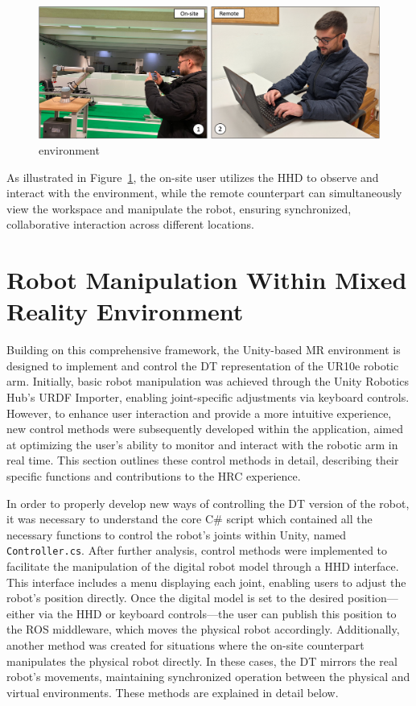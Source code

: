 \begin{figure}[h]
    \centering
    \includegraphics[width=\linewidth]{figs/mr-collab.png}
    \caption{environment}
    \label{fig:project_framework}
\end{figure}

As illustrated in Figure~\ref{fig:project_framework}, the on-site user utilizes the \ac{HHD} to observe and interact with the environment, while the remote counterpart can simultaneously view the workspace and manipulate the robot, ensuring synchronized, collaborative interaction across different locations.


\section{Robot Manipulation Within Mixed Reality Environment}

Building on this comprehensive framework, the Unity-based \ac{MR} environment is designed to implement and control the \ac{DT} representation of the UR10e robotic arm. Initially, basic robot manipulation was achieved through the Unity Robotics Hub's \ac{URDF} Importer, enabling joint-specific adjustments via keyboard controls. However, to enhance user interaction and provide a more intuitive experience, new control methods were subsequently developed within the application, aimed at optimizing the user’s ability to monitor and interact with the robotic arm in real time. This section outlines these control methods in detail, describing their specific functions and contributions to the \ac{HRC} experience. 

In order to properly develop new ways of controlling the \ac{DT} version of the robot, it was necessary to understand the core C\# script which contained all the necessary functions to control the robot's joints within Unity, named \texttt{Controller.cs}. After further analysis, control methods were implemented to facilitate the manipulation of the digital robot model through a \ac{HHD} interface. This interface includes a menu displaying each joint, enabling users to adjust the robot’s position directly. Once the digital model is set to the desired position—either via the \ac{HHD} or keyboard controls—the user can publish this position to the \ac{ROS} middleware, which moves the physical robot accordingly. Additionally, another method was created for situations where the on-site counterpart manipulates the physical robot directly. In these cases, the \ac{DT} mirrors the real robot’s movements, maintaining synchronized operation between the physical and virtual environments. These methods are explained in detail below.


